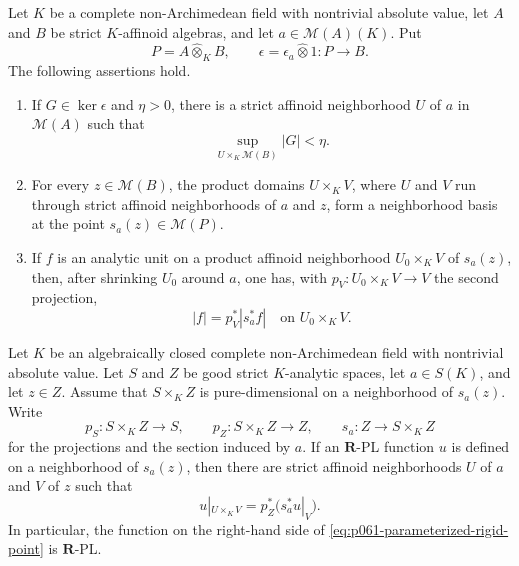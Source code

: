 
\begin{lemma}
\label{lem:p061-rational-section-tube}
Let \(K\) be a complete non-Archimedean field with nontrivial absolute
value, let \(A\) and \(B\) be strict \(K\)-affinoid algebras, and let
\(a\in\mathcal M(A)(K)\).  Put
\[
 P=A\widehat\otimes_KB,
 \qquad
 \epsilon=\epsilon_a\widehat\otimes 1:P\longrightarrow B.
\]
The following assertions hold.
\begin{enumerate}
\item If \(G\in\ker\epsilon\) and \(\eta>0\), there is a strict affinoid
neighborhood \(U\) of \(a\) in \(\mathcal M(A)\) such that
\[
          \sup_{U\times_K\mathcal M(B)}|G|<\eta.
\]
\item For every \(z\in\mathcal M(B)\), the product domains
\(U\times_KV\), where \(U\) and \(V\) run through strict affinoid
neighborhoods of \(a\) and \(z\), form a neighborhood basis at the point
\(s_a(z)\in\mathcal M(P)\).
\item If \(f\) is an analytic unit on a product affinoid neighborhood
\(U_0\times_KV\) of \(s_a(z)\), then, after shrinking \(U_0\) around
\(a\), one has, with \(p_V:U_0\times_KV\to V\) the second projection,
\begin{equation}
\label{eq:p061-unit-constant-transverse}
              |f|=p_V^*|s_a^*f|
              \quad\text{on }U_0\times_KV.
\end{equation}
\end{enumerate}
\end{lemma}

\begin{lemma}
\label{lem:p061-parameterized-rigid-point}
Let \(K\) be an algebraically closed complete non-Archimedean field with
nontrivial absolute value.  Let \(S\) and \(Z\) be good strict
\(K\)-analytic spaces, let \(a\in S(K)\), and let \(z\in Z\).  Assume
that \(S\times_KZ\) is pure-dimensional on a neighborhood of
\(s_a(z)\).  Write
\[
 p_S:S\times_KZ\longrightarrow S,
 \qquad
 p_Z:S\times_KZ\longrightarrow Z,
 \qquad
 s_a:Z\longrightarrow S\times_KZ
\]
for the projections and the section induced by \(a\).  If an
\(\mathbf R\)-PL function \(u\) is defined on a neighborhood of
\(s_a(z)\), then there are strict affinoid neighborhoods \(U\) of \(a\)
and \(V\) of \(z\) such that
\begin{equation}
\label{eq:p061-parameterized-rigid-point}
 u|_{U\times_KV}=p_Z^*\bigl(s_a^*u|_V\bigr).
\end{equation}
In particular, the function on the right-hand side of
\eqref{eq:p061-parameterized-rigid-point} is \(\mathbf R\)-PL.
\end{lemma}

